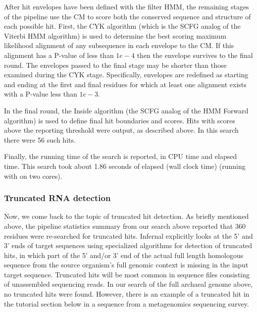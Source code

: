 After hit envelopes have been defined with the filter HMM, the
remaining stages of the pipeline use the CM to score both the
conserved sequence and structure of each possible hit. First, the CYK
algorithm (which is the SCFG analog of the Viterbi HMM algorithm) is
used to determine the best scoring maximum likelihood alignment of any
subsequence in each envelope to the CM. If this alignment has a
P-value of less than $1e-4$ then the envelope survives to the final
round. The envelopes passed to the final stage may be shorter than
those examined during the CYK stage. Specifically, envelopes are
redefined as starting and ending at the first and final residues for
which at least one alignment exists with a P-value less than $1e-3$.

In the final round, the Inside algorithm (the SCFG analog of
the HMM Forward algorithm) is used to define
final hit boundaries and scores. Hits with scores above the reporting
threshold were output, as described above. In this search there were
56 such hits. 

Finally, the running time of the search is reported, in CPU time and
elapsed time. This search took about 1.86 seconds of elapsed (wall
clock time) (running with  on two cores). 

\subsubsection{Truncated RNA detection}

Now, we come back to the topic of truncated hit detection.  As briefly
mentioned above, the pipeline statistics summary from our search above
reported that 360 residues were re-searched for truncated
hits. Infernal explicitly looks at the 5' and 3' ends of target
sequences using specialized algorithms for detection of truncated
hits, in which part of the 5' and/or 3' end of the actual full length
homologous sequence from the source organism's full genomic context is
missing in the input target sequence. Truncated hits will be most
common in sequence files consisting of unassembled sequencing
reads. In our search of the full archaeal genome above, no truncated
hits were found. However, there is an example of a truncated hit in
the  tutorial section below in a sequence from a
metagenomics sequencing survey.

